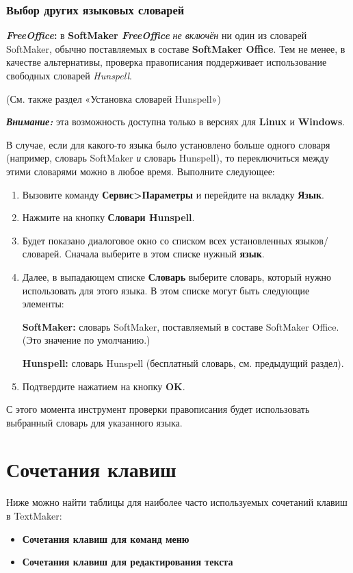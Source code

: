 ﻿\documentclass[a4paper,10pt]{article}
\begin{document}
 \subsubsection{Выбор других языковых словарей}
 \begin{mdframed}[backgroundcolor=pink!50]
\textbf{\textit{FreeOffice}:} в \textbf{SoftMaker \textit{FreeOffice}} \textit{не включён} ни один из словарей SoftMaker, обычно поставляемых в составе \textbf{SoftMaker Office}. Тем не менее, в качестве альтернативы, проверка правописания поддерживает
использование свободных словарей \textit{Hunspell}.

(См. также раздел «Установка словарей Hunspell»)
\end{mdframed}
 
  \begin{mdframed}[backgroundcolor=blue!10]
\textbf{\textit{Внимание:}} эта возможность доступна только в версиях для \textbf{Linux} и \textbf{Windows}.
\end{mdframed}
 
 В случае, если для какого-то языка было установлено больше одного словаря (например, словарь SoftMaker \textit{и} словарь Hunspell), то переключиться между этими словарями можно в любое время. Выполните следующее:
 \begin{enumerate}
  \item Вызовите команду \textbf{Сервис>Параметры} и перейдите на вкладку \textbf{Язык}.
  \item Нажмите на кнопку \textbf{Словари Hunspell}.
  \item Будет показано диалоговое окно со списком всех установленных языков/словарей. Сначала выберите в этом списке нужный \textbf{язык}.
  \item Далее, в выпадающем списке \textbf{Словарь} выберите словарь, который нужно использовать для этого языка. В этом списке могут быть следующие элементы:
  
  \textbf{SoftMaker:} словарь SoftMaker, поставляемый в составе SoftMaker Office. (Это значение по умолчанию.)
  
  \textbf{Hunspell:} словарь Hunspell (бесплатный словарь, см. предыдущий раздел).
  \item Подтвердите нажатием на кнопку \textbf{OK}.
 \end{enumerate}

 С этого момента инструмент проверки правописания будет использовать выбранный словарь для указанного языка.
 
 \section{Сочетания клавиш} \label{sec:сочетанияклав}
 Ниже можно найти таблицы для наиболее часто используемых сочетаний клавиш в TextMaker:
 \begin{itemize}
  \item \textbf{Сочетания клавиш для команд меню}
  \item \textbf{Сочетания клавиш для редактирования текста}
 \end{itemize}
\end{document}
